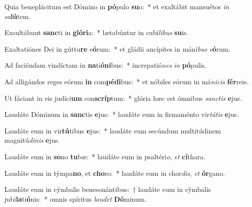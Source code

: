 \item Quia beneplácitum est Dómino in \textbf{pó}pulo \textbf{su}o:~* et exaltábit mansuétos \textit{in} \textit{sa}\textbf{lú}tem.
\item Exsultábunt \textbf{sanc}ti in \textbf{gló}\textbf{ri}a:~* lætabúntur in cubí\textit{li}\textit{bus} \textbf{su}is.
\item Exaltatiónes Dei in gúttu\textbf{re} e\textbf{ó}rum:~* et gládii ancípites in máni\textit{bus} \textit{e}\textbf{ó}rum.
\item Ad faciéndam vindíctam in \textbf{na}ti\textbf{ó}\textbf{ni}bus:~* increpatió\textit{nes} \textit{in} \textbf{pó}pulis.
\item Ad alligándos reges eórum \textbf{in} com\textbf{pé}\textbf{di}bus:~* et nóbiles eórum in má\textit{ni}\textit{cis} \textbf{fér}reis.
\item Ut fáciant in eis judíci\textbf{um} con\textbf{scríp}tum:~* glória hæc est ómnibus \textit{sanc}\textit{tis} \textbf{e}jus.
\item Laudáte Dóminum in \textbf{sanc}tis \textbf{e}jus:~* laudáte eum in firmaménto vir\textit{tú}\textit{tis} \textbf{e}jus.
\item Laudáte eum in vir\textbf{tú}tibus \textbf{e}jus:~* laudáte eum secúndum multitúdinem magnitú\textit{di}\textit{nis} \textbf{e}jus.
\item Laudáte eum in \textbf{so}no \textbf{tu}bæ:~* laudáte eum in psaltéri\textit{o}, \textit{et} \textbf{cí}thara.
\item Laudáte eum in týmpa\textbf{no}, et \textbf{cho}ro:~* laudáte eum in chor\textit{dis}, \textit{et} \textbf{ór}gano.
\item Laudáte eum in cýmbalis benesonántibus:~† laudáte eum in cýmbalis jubi\textbf{la}ti\textbf{ó}nis:~* omnis spíritus \textit{lau}\textit{det} \textbf{Dó}minum.
